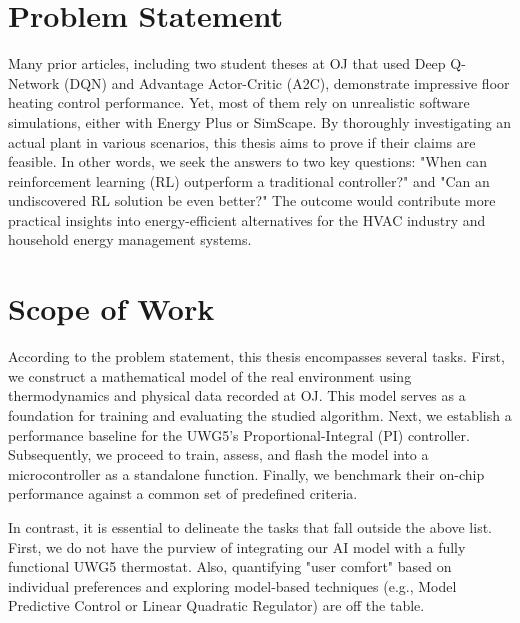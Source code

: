 \documentclass[../main.tex]{subfiles}
\begin{document}

\section{Problem Statement}
Many prior articles, including two student theses at OJ that used Deep Q-Network (DQN) and Advantage Actor-Critic (A2C), demonstrate impressive floor heating control performance. Yet, most of them rely on unrealistic software simulations, either with Energy Plus or SimScape. By thoroughly investigating an actual plant in various scenarios, this thesis aims to prove if their claims are feasible. In other words, we seek the answers to two key questions: "When can reinforcement learning (RL) outperform a traditional controller?" and "Can an undiscovered RL solution be even better?" The outcome would contribute more practical insights into energy-efficient alternatives for the HVAC industry and household energy management systems.



\section{Scope of Work}
According to the problem statement, this thesis encompasses several tasks. First, we construct a mathematical model of the real environment using thermodynamics and physical data recorded at OJ. This model serves as a foundation for training and evaluating the studied algorithm. Next, we establish a performance baseline for the UWG5's Proportional-Integral (PI) controller. Subsequently, we proceed to train, assess, and flash the model into a microcontroller as a standalone function. Finally, we benchmark their on-chip performance against a common set of predefined criteria.

In contrast, it is essential to delineate the tasks that fall outside the above list. First, we do not have the purview of integrating our AI model with a fully functional UWG5 thermostat. Also, quantifying "user comfort" based on individual preferences and exploring model-based techniques (e.g., Model Predictive Control or Linear Quadratic Regulator) are off the table.
\end{document}
